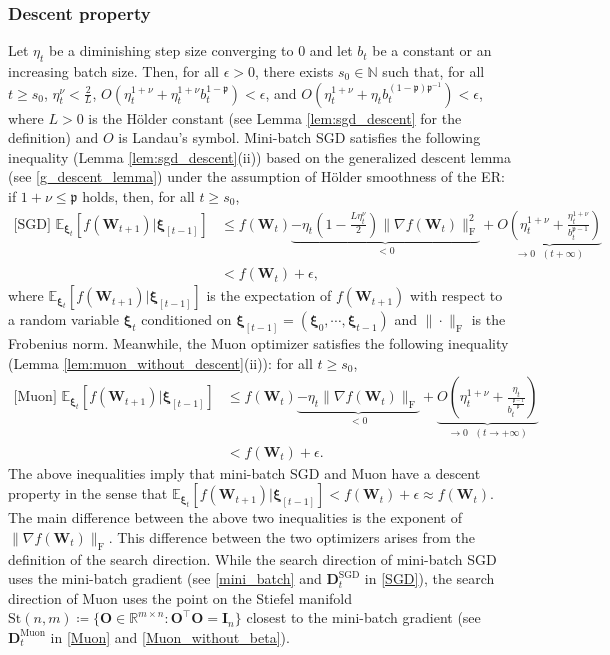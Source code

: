 \documentclass[twoside,11pt]{article}
\begin{document}
\subsubsection{Descent property}
\label{sec:1.3.1}
Let $\eta_t$ be a diminishing step size converging to $0$ and let $b_t$ be a constant or an increasing batch size. Then, for all $\epsilon > 0$, there exists $s_0 \in \mathbb{N}$ such that, for all $t \geq s_0$, $\eta_t^\nu < \frac{2}{L}$, $O(\eta_t^{1 + \nu} + \eta_t^{1 + \nu} b_t^{1 - \mathfrak{p}}) < \epsilon$, and $O ( \eta_t^{1 + \nu} + \eta_t b_t^{(1 - \mathfrak{p})\mathfrak{p}^{-1}}) < \epsilon$, where $L > 0$ is the H\"{o}lder constant (see Lemma \ref{lem:sgd_descent} for the definition)
and $O$ is Landau's symbol. Mini-batch SGD satisfies the following inequality (Lemma \ref{lem:sgd_descent}(ii)) based on the generalized descent lemma (see \eqref{g_descent_lemma}) under the assumption of H\"{o}lder smoothness of the ER: if $1 + \nu \leq \mathfrak{p}$ holds, then, for all $t \geq s_0$, 
\begin{align*}
\text{[SGD] } 
\mathbb{E}_{\bm{\xi}_t} \left[f (\bm{W}_{t+1}) |\bm{\xi}_{[t-1]} \right] 
&\leq
f(\bm{W}_{t})
\underbrace{- \eta_t \left( 1 - \frac{L \eta_t^\nu}{2} \right) \| \nabla f (\bm{W}_t) \|_{\mathrm{F}}^2}_{< 0} 
+ 
\underbrace{O \left( \eta_t^{1 + \nu} 
+ \frac{\eta_t^{1 + \nu}}{b_t^{\mathfrak{p}-1}} \right)}_{\to 0 \text{ } (t + \infty)}\\
&<
f(\bm{W}_{t}) 
+ \epsilon,
\end{align*}
where $\mathbb{E}_{\bm{\xi}_t} [f (\bm{W}_{t+1}) |\bm{\xi}_{[t-1]}]$ is the expectation of $f(\bm{W}_{t+1})$ with respect to a random variable $\bm{\xi}_t$ conditioned on $\bm{\xi}_{[t-1]} = (\bm{\xi}_0, \cdots, \bm{\xi}_{t-1})$ and $\|\cdot\|_{\mathrm{F}}$ is the Frobenius norm. Meanwhile, the Muon optimizer satisfies the following inequality (Lemma \ref{lem:muon_without_descent}(ii)): for all $t \geq s_0$,
\begin{align*}
\text{[Muon] }
\mathbb{E}_{\bm{\xi}_t} \left[f (\bm{W}_{t+1}) |\bm{\xi}_{[t-1]} \right] 
&\leq
f(\bm{W}_{t})
\underbrace{- \eta_t \| \nabla f (\bm{W}_t) \|_{\mathrm{F}}}_{< 0}
+ 
\underbrace{O \left( \eta_t^{1 + \nu} 
+  
\frac{\eta_t}{b_t^{\frac{\mathfrak{p} -1}{\mathfrak{p}}}} \right)}_{\to 0 \text{ } (t \to + \infty)}\\
&<
f(\bm{W}_{t}) + \epsilon.
\end{align*}
The above inequalities imply that mini-batch SGD and Muon have a descent property in the sense that $\mathbb{E}_{\bm{\xi}_t} [f (\bm{W}_{t+1}) |\bm{\xi}_{[t-1]}] < f (\bm{W}_t) + \epsilon \approx f (\bm{W}_t)$. The main difference between the above two inequalities is the exponent of $\| \nabla f (\bm{W}_t)\|_{\mathrm{F}}$. This difference between the two optimizers arises from the definition of the search direction. While the search direction of mini-batch SGD uses the mini-batch gradient (see \eqref{mini_batch} and $\bm{D}_t^{\mathrm{SGD}}$ in \eqref{SGD}), the search direction of Muon uses the point on the Stiefel manifold $\mathrm{St}(n,m) \coloneqq \{ \bm{O} \in \mathbb{R}^{m \times n} \colon \bm{O}^\top \bm{O} = \bm{I}_n \}$ closest to the mini-batch gradient (see $\bm{D}_t^{\mathrm{Muon}}$ in \eqref{Muon} and \eqref{Muon_without_beta}). 
\end{document}
